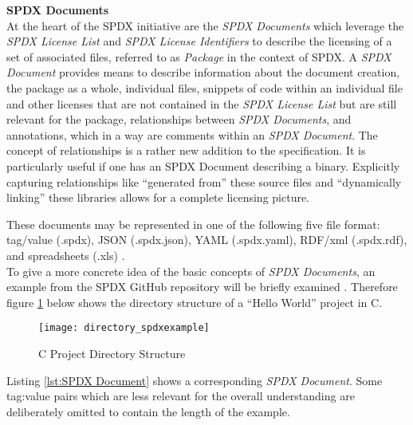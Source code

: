\noindent
\textbf{SPDX Documents}\\
At the heart of the SPDX initiative are the \textit{SPDX Documents} which leverage the \textit{SPDX License List} and \textit{SPDX License Identifiers} to describe the licensing of a set of associated files, referred to as \textit{Package} in the context of SPDX. A \textit{SPDX Document} provides means to describe information about the document creation, the package as a whole, individual files, snippets of code within an individual file and other licenses that are not contained in the \textit{SPDX License List} but are still relevant for the package, relationships between \textit{SPDX Documents}, and annotations, which in a way are comments within an \textit{SPDX Document}. The concept of relationships is a rather new addition to the specification. It is particularly useful if one has an SPDX Document describing a binary. Explicitly capturing relationships like \enquote{generated from} these source files and \enquote{dynamically linking} these libraries allows for a complete licensing picture. \par
These documents may be represented in one of the following five file format: tag/value (.spdx), JSON (.spdx.json), YAML (.spdx.yaml), RDF/xml (.spdx.rdf), and spreadsheets (.xls) \cite{SPDXWebsite, SPDXSpec}.\\

To give a more concrete idea of the basic concepts of \textit{SPDX Documents}, an example from the SPDX GitHub repository will be briefly examined \cite{SPDXExamples}. Therefore figure \ref{fig:C Project} below shows the directory structure of a \enquote{Hello World} project in C.

\begin{figure}[H]
	\centering
	\texttt{[image: directory\_spdxexample]}
	\caption[C Project Directory Structure]{C Project Directory Structure }
	\label{fig:C Project}
\end{figure}

Listing \ref{lst:SPDX Document} shows a corresponding \textit{SPDX Document}. Some tag:value pairs which are less relevant for the overall understanding are deliberately omitted to contain the length of the example.\\ 

